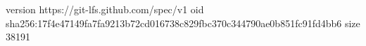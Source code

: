 version https://git-lfs.github.com/spec/v1
oid sha256:17f4e47149fa7fa9213b72cd016738c829fbc370c344790ae0b851fc91fd4bb6
size 38191
